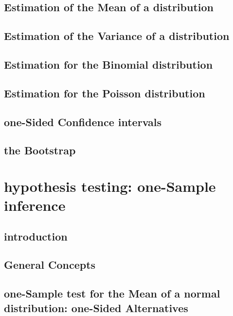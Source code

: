 \documentclass[12pt,]{article}
\theoremstyle{definition}
\theoremstyle{definition}
\theoremstyle{definition}
\theoremstyle{remark}
\begin{document}
\subsection{Estimation of the Mean of a
distribution}\label{estimation-of-the-mean-of-a-distribution}

\subsection{Estimation of the Variance of a
distribution}\label{estimation-of-the-variance-of-a-distribution}

\subsection{Estimation for the Binomial
distribution}\label{estimation-for-the-binomial-distribution}

\subsection{Estimation for the Poisson
distribution}\label{estimation-for-the-poisson-distribution}

\subsection{one-Sided Confidence
intervals}\label{one-sided-confidence-intervals}

\subsection{the Bootstrap}\label{the-bootstrap}

\section{hypothesis testing: one-Sample
inference}\label{hypothesis-testing-one-sample-inference}

\subsection{introduction}\label{introduction-5}

\subsection{General Concepts}\label{general-concepts-1}

\subsection{one-Sample test for the Mean of a normal distribution:
one-Sided
Alternatives}\label{one-sample-test-for-the-mean-of-a-normal-distribution-one-sided-alternatives}
\end{document}
